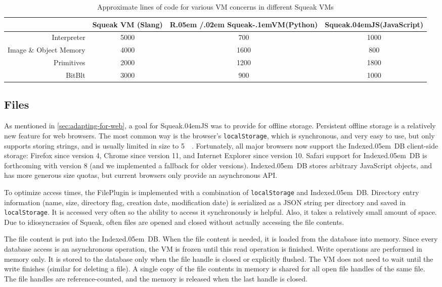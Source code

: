 \documentclass[natbib]{sigplanconf}
\newcommand*\SqueakJS{Squeak\texorpdfstring{\kern.04em}{}JS\xspace}
\newcommand*\JS{JavaScript\xspace}
\newcommand*\RSqueakVM{R\kern.05em /\kern.02em Squeak\kern-.1emVM\xspace}
\newcommand*\IndexedDB{\mbox{Indexed\kern.05em DB}\xspace}
\begin{document}
\begin{table}
  \centering
  \begin{tabular}{r c c c}
    \toprule
    & Squeak \ac{VM} (Slang) & \RSqueakVM (Python) & \SqueakJS (\JS) \\
    \midrule
    Interpreter & 5000 & 700 & 1000 \\
    Image \& Object Memory & 4000 & 1600 & 800 \\
    Primitives & 2000 & 1200 & 1800 \\
    BitBlt & 3000 & 900 & 1000 \\
    \bottomrule
  \end{tabular}
  \caption{Approximate lines of code for various \ac{VM} concerns in
    different Squeak VMs}
  \label{tab:sloc}
\end{table}

\subsection{Files}
\label{sec:files}

As mentioned in \autoref{sec:adapting-for-web}, a goal for \SqueakJS
was to provide for offline storage. Persistent offline storage is a
relatively new feature for web browsers. The most common way is the
browser's \lstinline|localStorage|, which is synchronous, and very
easy to use, but only supports storing strings, and is usually limited
in size to \SI{5}{\mega\byte}. Fortunately, all major browsers now
support the \IndexedDB client-side storage: Firefox since version 4,
Chrome since version 11, and Internet Explorer since version 10.
Safari support for \IndexedDB is forthcoming with version 8 (and we
implemented a fallback for older versions). \IndexedDB stores
arbitrary \JS objects, and has more generous size quotas, but current
browsers only provide an asynchronous \ac{API}.

To optimize access times, the FilePlugin is implemented with a
combination of \lstinline|localStorage| and \IndexedDB. Directory
entry information (name, size, directory flag, creation date,
modification date) is serialized as a JSON string per directory and
saved in \lstinline|localStorage|. It is accessed very often so the
ability to access it synchronously is helpful. Also, it takes a
relatively small amount of space. Due to idiosyncrasies of Squeak,
often files are opened and closed without actually accessing the file
contents.

The file content is put into the \IndexedDB. When the file content is
needed, it is loaded from the database into memory. Since every
database access is an asynchronous operation, the \ac{VM} is frozen
until this read operation is finished. Write operations are performed
in memory only. It is stored to the database only when the file handle
is closed or explicitly flushed. The \ac{VM} does not need to wait
until the write finishes (similar for deleting a file). A single copy
of the file contents in memory is shared for all open file handles of
the same file. The file handles are reference-counted, and the memory
is released when the last handle is closed.
\end{document}
